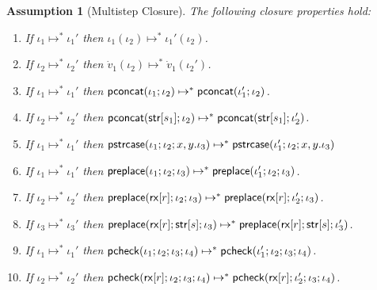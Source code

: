 \documentclass[11pt,leqno]{article}
\newtheorem{ass}[tr]{Assumption}
\theoremstyle{definition}
\newcommand{\tcheck}[4]{{\sf pcheck}(#1; #2; #3; #4)}
\renewcommand{\tstr}[1]{{{\sf str}[#1]}}
\newcommand{\treplace}[3]{{\sf preplace}(#1;#2;#3)}
\newcommand{\tconcat}[2]{{\sf pconcat}(#1;#2)} %
\newcommand{\rx}[1]{ {\sf rx}[#1] }
\newcommand{\pstrcase}[3]{ {\sf pstrcase}(#1; #2; #3)}
\begin{document}
\begin{ass}[Multistep Closure]\label{ass:closure} The following closure properties hold:
\begin{enumerate}
\item If $\iota_1 \mapsto^{*} \iota_1'$ then $\iota_1(\iota_2) \mapsto^{*} \iota_1'(\iota_2)$.
\item If $\iota_2 \mapsto^{*} \iota_2'$ then $\dot{v}_1(\iota_2) \mapsto^{*} \dot{v}_1(\iota_2')$.

\item If $\iota_1 \mapsto^{*} \iota_1'$ then $\tconcat{\iota_1}{\iota_2} \mapsto^* \tconcat{\iota_1'}{\iota_2}$.

\item If $\iota_2 \mapsto^{*} \iota_2'$ then $\tconcat{\tstr{s_1}}{\iota_2} \mapsto^* \tconcat{\tstr{s_1}}{\iota_2'}$.

\item If $\iota_1 \mapsto^* \iota_1'$
then $\pstrcase{\iota_1}{\iota_2}{x, y . \iota_3} \mapsto^* \pstrcase{\iota_1'}{\iota_2}{x, y. \iota_3}$

\item If $\iota_1 \mapsto^{*} \iota_1'$ then $\treplace{\iota_1}{\iota_2}{\iota_3} \mapsto^* \treplace{\iota_1'}{\iota_2}{\iota_3}$.

\item If $\iota_2 \mapsto^{*} \iota_2'$ then $\treplace{\rx{r}}{\iota_2}{\iota_3} \mapsto^* \treplace{\rx{r}}{\iota_2'}{\iota_3}$.

\item If $\iota_3 \mapsto^{*} \iota_3'$ then $\treplace{\rx{r}}{\tstr{s}}{\iota_3} \mapsto^* \treplace{\rx{r}}{\tstr{s}}{\iota_3'}$.

\item If $\iota_1 \mapsto^{*} \iota_1'$ then $\tcheck{\iota_1}{\iota_2}{\iota_3}{\iota_4} \mapsto^* \tcheck{\iota_1'}{\iota_2}{\iota_3}{\iota_4}$. 

\item If $\iota_2 \mapsto^{*} \iota_2'$ then $\tcheck{\rx{r}}{\iota_2}{\iota_3}{\iota_4} \mapsto^* \tcheck{\rx{r}}{\iota_2'}{\iota_3}{\iota_4}$.
\end{enumerate}
\end{ass}
\end{document}
